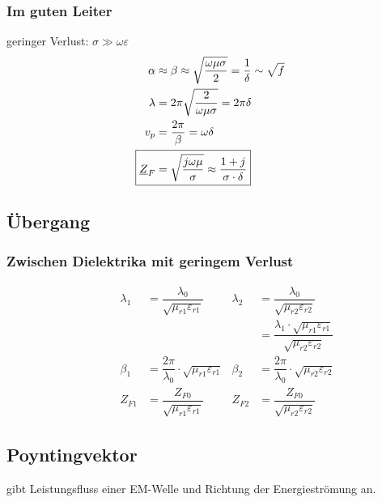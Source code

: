 \subsubsection{Im guten Leiter}
geringer Verlust: $\sigma \gg\omega\varepsilon$
\begin{align*}
    \alpha                  & \approx \beta \approx\sqrt{\frac{\omega\mu\sigma}{2}}=\dfrac{1}{\delta}\sim\sqrt{f} \\
    \lambda                 & = 2\pi \sqrt{\dfrac{2}{\omega\mu\sigma}}=2\pi\delta                                 \\
    v_p                     & = \frac{2\pi}{\beta} = \omega\delta                                                 \\
    \Aboxed{\underline{Z}_F & = \sqrt{\dfrac{j\omega\mu}{\sigma}} \approx \dfrac{1+j}{\sigma\cdot\delta}}
\end{align*}
\newpage
\subsection{Übergang}
\subsubsection{Zwischen Dielektrika mit geringem Verlust}


\begin{align*}
    \quad \qquad \lambda_1 & = \dfrac{\lambda_0}{\sqrt{\mu_{r1}\varepsilon_{r1}}}          & \lambda_2 & = \dfrac{\lambda_0}{\sqrt{\mu_{r2}\varepsilon_{r2}}}                                     \\
    \quad \qquad           &                                                               &           & = \dfrac{\lambda_1\cdot\sqrt{\mu_{r1}\varepsilon_{r1}}}{\sqrt{\mu_{r2}\varepsilon_{r2}}} \\
    \quad \qquad \beta_1   & = \dfrac{2\pi}{\lambda_0}\cdot\sqrt{\mu_{r1}\varepsilon_{r1}} & \beta_2   & = \dfrac{2\pi}{\lambda_0}\cdot\sqrt{\mu_{r2}\varepsilon_{r2}}                            \\
    \quad \qquad Z_{F1}    & = \dfrac{Z_{F0}}{\sqrt{\mu_{r1}\varepsilon_{r1}}}             & Z_{F2}    & = \dfrac{Z_{F0}}{\sqrt{\mu_{r2}\varepsilon_{r2}}}
\end{align*}

\subsection{Poyntingvektor}
gibt Leistungsfluss einer EM-Welle und Richtung der Energieströmung an.\\

